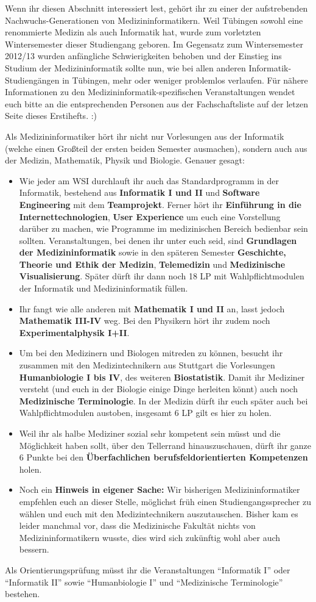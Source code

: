 
Wenn ihr diesen Abschnitt interessiert lest, gehört ihr zu einer der aufstrebenden Nachwuchs-Generationen von Medizininformatikern. Weil Tübingen sowohl eine renommierte Medizin als auch Informatik hat, wurde zum vorletzten Wintersemester dieser Studiengang geboren. Im Gegensatz zum Wintersemester 2012/13 wurden anfängliche Schwierigkeiten behoben und der Einstieg ins Studium der Medizininformatik sollte nun, wie bei allen anderen Informatik-Studiengängen in Tübingen, mehr oder weniger problemlos verlaufen.
Für nähere Informationen zu den Medizininformatik-spezifischen Veranstaltungen
wendet euch bitte an die entsprechenden Personen aus der Fachschaftsliste auf
der letzen Seite dieses Erstihefts. :)

Als Medizininformatiker hört ihr nicht nur Vorlesungen aus der Informatik (welche einen Großteil der ersten beiden Semester ausmachen), sondern auch aus der Medizin, Mathematik, Physik und Biologie. Genauer gesagt:
\begin{itemize}
	\item Wie jeder am WSI durchlauft ihr auch das Standardprogramm in der Informatik, bestehend aus \textbf{Informatik I und II} und \textbf{Software Engineering} mit dem \textbf{Teamprojekt}. Ferner hört ihr \textbf{Einführung in die Internettechnologien}, \textbf{User Experience} um euch eine Vorstellung darüber zu machen, wie Programme im medizinischen Bereich bedienbar sein sollten. Veranstaltungen, bei denen ihr unter euch seid, sind \textbf{Grundlagen der Medizininformatik} sowie in den späteren Semester \textbf{Geschichte, Theorie und Ethik der
	Medizin}, \textbf{Telemedizin} und \textbf{Medizinische Visualisierung}. Später dürft ihr dann noch 18 LP mit Wahlpflichtmodulen der Informatik und Medizininformatik füllen.
	\item Ihr fangt wie alle anderen mit \textbf{Mathematik I und II} an, lasst jedoch \textbf{Mathematik III-IV} weg.  Bei den Physikern hört ihr zudem noch \textbf{Experimentalphysik I+II}.
	\item Um bei den Medizinern und Biologen mitreden zu können, besucht ihr zusammen mit den Medizintechnikern aus Stuttgart die Vorlesungen \textbf{Humanbiologie I bis IV}, des weiteren \textbf{Biostatistik}. Damit ihr Mediziner versteht (und euch in der Biologie einige Dinge herleiten könnt) auch noch \textbf{Medizinische Terminologie}. In der Medizin dürft ihr euch später auch bei Wahlpflichtmodulen austoben, insgesamt 6 LP gilt es hier zu holen.
	\item Weil ihr als halbe Mediziner sozial sehr kompetent sein müsst und die Möglichkeit haben sollt, über den Tellerrand hinauszuschauen, dürft ihr ganze 6 Punkte bei den \textbf{Überfachlichen berufsfeldorientierten Kompetenzen} holen.
	\item Noch ein \textbf{Hinweis in eigener Sache:} Wir bisherigen Medizininformatiker empfehlen euch an dieser Stelle, möglichst früh einen Studiengangssprecher zu wählen und euch mit den Medizintechnikern auszutauschen. Bisher kam es leider manchmal vor, dass die Medizinische Fakultät nichts von Medizininformatikern wusste, dies wird sich zukünftig wohl aber auch bessern.
\end{itemize}

Als Orientierungsprüfung müsst ihr die Veranstaltungen "`Informatik I"' oder "`Informatik II"' sowie "`Humanbiologie I"' und "`Medizinische Terminologie"' bestehen.

